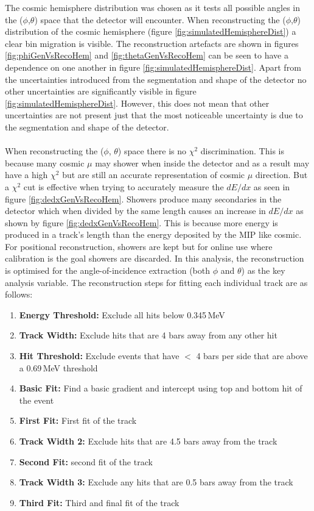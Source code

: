 The cosmic hemisphere distribution was chosen as it tests all possible angles in the ($\phi$,$\theta$) space that the detector will encounter. When reconstructing the ($\phi$,$\theta$) distribution of the cosmic hemisphere (figure \ref{fig:simulatedHemisphereDist}) a clear bin migration is visible. The reconstruction artefacts are shown in figures \ref{fig:phiGenVsRecoHem} and \ref{fig:thetaGenVsRecoHem} can be seen to have a dependence on one another in figure \ref{fig:simulatedHemisphereDist}. Apart from the uncertainties introduced from the segmentation and shape of the detector no other uncertainties are significantly visible in figure \ref{fig:simulatedHemisphereDist}. However, this does not mean that other uncertainties are not present just that the most noticeable uncertainty is due to the segmentation and shape of the detector. 
\\\\When reconstructing the ($\phi$, $\theta$) space there is no $\chi^2$ discrimination. This is because many cosmic $\mu$ may shower when inside the detector and as a result may have a high $\chi^2$ but are still an accurate representation of cosmic $\mu$ direction. But a $\chi^2$ cut is effective when trying to accurately measure the $dE/dx$ as seen in figure \ref{fig:dedxGenVsRecoHem}. Showers produce many secondaries in the detector which when divided by the same length causes an increase in $dE/dx$ as shown by figure \ref{fig:dedxGenVsRecoHem}. This is because more energy is produced in a track's length than the energy deposited by the MIP like cosmic. For positional reconstruction, showers are kept but for online use where calibration is the goal showers are discarded. In this analysis, the reconstruction is optimised for the angle-of-incidence extraction (both $\phi$ and $\theta$) as the key analysis variable. The reconstruction steps for fitting each individual track are as follows: 
\begin{enumerate}
  \item \textbf{Energy Threshold:} Exclude all hits below 0.345\,MeV
  \item \textbf{Track Width:} Exclude hits that are 4 bars away from any other hit 
  \item \textbf{Hit Threshold:} Exclude events that have $<$ 4 bars per side that are above a 0.69\,MeV threshold
  \item \textbf{Basic Fit:} Find a basic gradient and intercept using top and bottom hit of the event
  \item \textbf{First Fit:} First fit of the track 
  \item \textbf{Track Width 2:} Exclude hits that are 4.5 bars away from the track
  \item \textbf{Second Fit:} second fit of the track
  \item \textbf{Track Width 3:} Exclude any hits that are 0.5 bars away from the track
  \item \textbf{Third Fit:} Third and final fit of the track
\end{enumerate}
